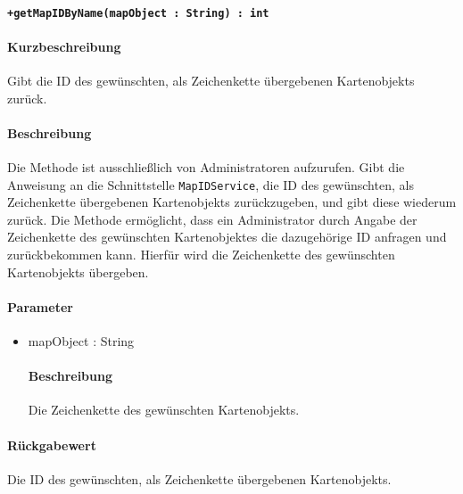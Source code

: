 \paragraph*{\texttt{+getMapIDByName(mapObject : String) : int}}%
\paragraph*{Kurzbeschreibung}
Gibt die ID des gewünschten, als Zeichenkette übergebenen Kartenobjekts zurück.
\paragraph*{Beschreibung}
Die Methode ist ausschließlich von Administratoren aufzurufen.
Gibt die Anweisung an die Schnittstelle \texttt{MapIDService}, die ID des gewünschten, als Zeichenkette übergebenen Kartenobjekts zurückzugeben, und gibt diese wiederum zurück.
Die Methode ermöglicht, dass ein Administrator durch Angabe der Zeichenkette des gewünschten Kartenobjektes die dazugehörige ID anfragen und zurückbekommen kann.
Hierfür wird die Zeichenkette des gewünschten Kartenobjekts übergeben.
\paragraph*{Parameter}
\begin{itemize}
	\item mapObject : String
		\paragraph*{Beschreibung}
		Die Zeichenkette des gewünschten Kartenobjekts.
\end{itemize}
\paragraph*{Rückgabewert}
Die ID des gewünschten, als Zeichenkette übergebenen Kartenobjekts.
